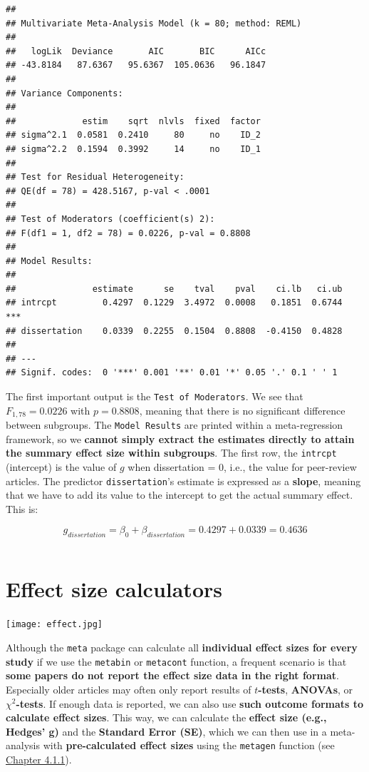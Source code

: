 \documentclass[]{book}
\begin{document}
\begin{verbatim}
## 
## Multivariate Meta-Analysis Model (k = 80; method: REML)
## 
##   logLik  Deviance       AIC       BIC      AICc  
## -43.8184   87.6367   95.6367  105.0636   96.1847  
## 
## Variance Components: 
## 
##             estim    sqrt  nlvls  fixed  factor
## sigma^2.1  0.0581  0.2410     80     no    ID_2
## sigma^2.2  0.1594  0.3992     14     no    ID_1
## 
## Test for Residual Heterogeneity: 
## QE(df = 78) = 428.5167, p-val < .0001
## 
## Test of Moderators (coefficient(s) 2): 
## F(df1 = 1, df2 = 78) = 0.0226, p-val = 0.8808
## 
## Model Results:
## 
##               estimate      se    tval    pval    ci.lb   ci.ub     
## intrcpt         0.4297  0.1229  3.4972  0.0008   0.1851  0.6744  ***
## dissertation    0.0339  0.2255  0.1504  0.8808  -0.4150  0.4828     
## 
## ---
## Signif. codes:  0 '***' 0.001 '**' 0.01 '*' 0.05 '.' 0.1 ' ' 1
\end{verbatim}

The first important output is the \texttt{Test\ of\ Moderators}. We see that \(F_{1,78}=0.0226\) with \(p=0.8808\), meaning that there is no significant difference between subgroups. The \texttt{Model\ Results} are printed within a meta-regression framework, so we \textbf{cannot simply extract the estimates directly to attain the summary effect size within subgroups}. The first row, the \texttt{intrcpt} (intercept) is the value of \(g\) when dissertation = 0, i.e., the value for peer-review articles. The predictor \texttt{dissertation}'s estimate is expressed as a \textbf{slope}, meaning that we have to add its value to the intercept to get the actual summary effect. This is:

\[g_{dissertation} = \beta_0 + \beta_{dissertation} = 0.4297+0.0339=0.4636\]

\[ \]

\hypertarget{effect-size-calculators}{%
\chapter{Effect size calculators}\label{effect-size-calculators}}

\texttt{[image: effect.jpg]}

Although the \texttt{meta} package can calculate all \textbf{individual effect sizes for every study} if we use the \texttt{metabin} or \texttt{metacont} function, a frequent scenario is that \textbf{some papers do not report the effect size data in the right format}. Especially older articles may often only report results of \(t\)\textbf{-tests}, \textbf{ANOVAs}, or \(\chi^2\)\textbf{-tests}. If enough data is reported, we can also use \textbf{such outcome formats to calculate effect sizes}. This way, we can calculate the \textbf{effect size (e.g., Hedges' g)} and the \textbf{Standard Error (SE)}, which we can then use in a meta-analysis with \textbf{pre-calculated effect sizes} using the \texttt{metagen} function (see \protect\hyperlink{pre.calc}{Chapter 4.1.1}).
\end{document}
